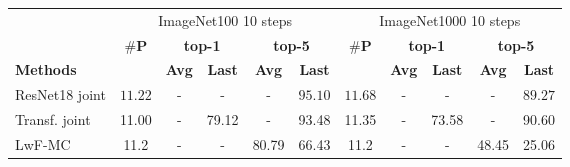 \begin{table*}[t]
    \centering
    \begin{tabular}{l|ccccc|ccccc}
        \toprule[0.3mm]
                                                                 & \multicolumn{5}{c|}{ImageNet100 10 steps} & \multicolumn{5}{c}{ImageNet1000 10 steps}                                                                                                                                                                                                                                                           \\
        \cmidrule{2-11}
                                                                 & \multirow{2}{*}{\textbf{$\#$P}}           & \multicolumn{2}{c}{\textbf{top-1}}        & \multicolumn{2}{c|}{\textbf{top-5}} & \multirow{2}{*}{\textbf{$\#$P}} & \multicolumn{2}{c}{\textbf{top-1}} & \multicolumn{2}{c}{\textbf{top-5}}                                                                                                         \\
        \cmidrule{3-6}
        \cmidrule{8-11}
        \textbf{Methods}                                         &                                           & \textbf{Avg}                              & \textbf{Last}                       & \textbf{Avg}                    & \textbf{Last}                      &                                    & \textbf{Avg}            & \textbf{Last}           & \textbf{Avg}            & \textbf{Last}           \\
        \hline
        ResNet18 joint                                           & $11.22$                                   & -                                         & -                                   & -                               & $95.10$                            & $11.68$                            & -                       & -                       & -                       & $89.27$                 \\
        Transf. joint                                            & 11.00                                     & -                                         & 79.12                               & -                               & 93.48                              & 11.35                              & -                       & 73.58                   & -                       & 90.60                   \\
        \midrule
        LwF-MC \cite{li2018lwf,rebuffi2017icarl}                 & 11.2                                      & -                                         & -                                   & 80.79                           & 66.43                              & 11.2                               & -                       & -                       & 48.45                   & 25.06                   \\

\end{tabular}
\end{table*}
